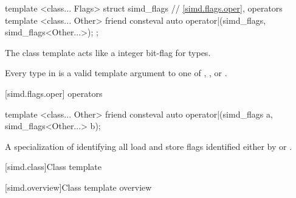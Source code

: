 \begin{codeblock}
template <class... Flags> struct simd_flags {
  // \ref{simd.flags.oper},  operators
  template <class... Other>
    friend consteval auto operator|(simd_flags, simd_flags<Other...>);
};
\end{codeblock}

\pnum
\begin{note}
The class template  acts like a integer bit-flag for types.
\end{note}

\pnum\constraints
Every type in  is a valid template argument to one of
, , or
.

[simd.flags.oper]{ operators}

\begin{itemdecl}
template <class... Other>
  friend consteval auto operator|(simd_flags a, simd_flags<Other...> b);
\end{itemdecl}

\begin{itemdescr}
  \pnum\returns
  A specialization of  identifying all load and
  store flags identified either by  or .
\end{itemdescr}

[simd.class]{Class template }

[simd.overview]{Class template  overview}

